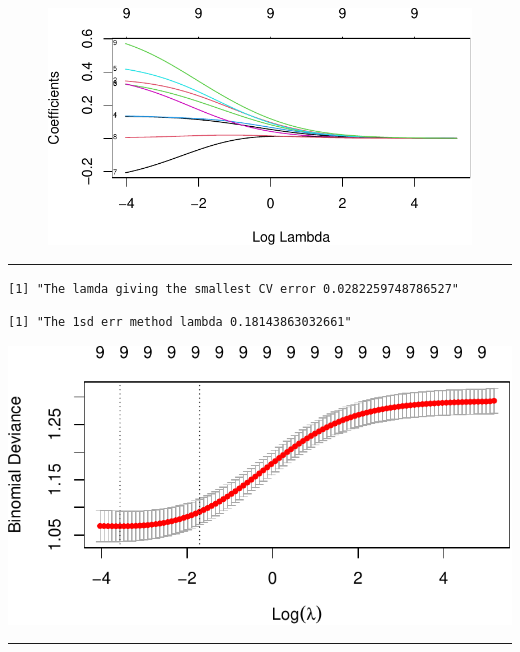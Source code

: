 \documentclass[
  letterpaper,
  DIV=11,
  numbers=noendperiod]{scrartcl}
\begin{document}
\begin{figure}[H]

{\centering \includegraphics{L10_files/figure-pdf/unnamed-chunk-9-1.pdf}

}

\end{figure}

\begin{center}\rule{0.5\linewidth}{0.5pt}\end{center}

\begin{verbatim}
[1] "The lamda giving the smallest CV error 0.0282259748786527"
\end{verbatim}

\begin{verbatim}
[1] "The 1sd err method lambda 0.18143863032661"
\end{verbatim}

\includegraphics{L10_files/figure-pdf/unnamed-chunk-10-1.pdf}

\begin{center}\rule{0.5\linewidth}{0.5pt}\end{center}
\end{document}
